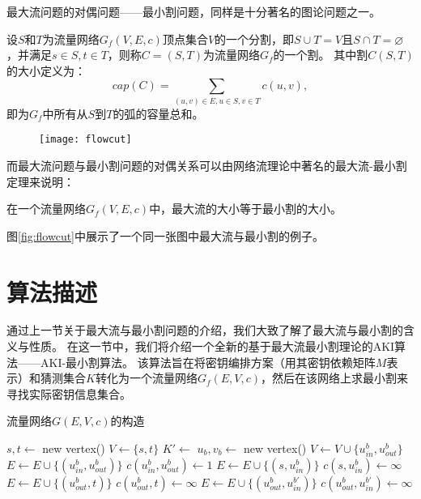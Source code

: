 最大流问题的对偶问题——最小割问题，同样是十分著名的图论问题之一。
\begin{defn}[割]
    设$S$和$T$为流量网络$G_f(V,E,c)$顶点集合$V$的一个分割，即$S\cup T=V$且$S\cap T=\varnothing$，并满足$s\in S,t\in T$，则称$C=(S,T)$为流量网络$G_f$的一个割。
    其中割$C(S,T)$的大小定义为：
    $$cap(C)=\sum_{(u,v)\in E,u\in S,v\in T}c(u,v),$$
    即为$G_f$中所有从$S$到$T$的弧的容量总和。
\end{defn}
\begin{figure}[htbp]
\centering
    \texttt{[image: flowcut]}
\end{figure}
而最大流问题与最小割问题的对偶关系可以由网络流理论中著名的最大流-最小割定理来说明：
\begin{thm}
    在一个流量网络$G_f(V,E,c)$中，最大流的大小等于最小割的大小。
\end{thm}
图\ref{fig:flowcut}中展示了一个同一张图中最大流与最小割的例子。

\section{算法描述}
通过上一节关于最大流与最小割问题的介绍，我们大致了解了最大流与最小割的含义与性质。
在这一节中，我们将介绍一个全新的基于最大流最小割理论的AKI算法——AKI-最小割算法。
该算法旨在将密钥编排方案（用其密钥依赖矩阵$M$表示）和猜测集合$K$转化为一个流量网络$G_f(E,V,c)$，然后在该网络上求最小割来寻找实际密钥信息集合。
\begin{algorithm}[h]
    \caption{流量网络$G(E,V,c)$的构造}
    \begin{algorithmic}[1]
            \State $s,t \gets$ new vertex()
            \State $V \gets \{s,t\}$
            \State $K' \gets$ 
            \State $u_b,v_b \gets$ new vertex()
            \State $V \gets V \cup \{u^b_{in},u^b_{out}\}$
            \State $E \gets E \cup \{(u^b_{in},u^b_{out})\}$
            \State $c(u^b_{in},u^b_{out}) \gets 1$
            \State $E \gets E \cup \{(s,u^b_{in})\}$
            \State $c(s,u^b_{in}) \gets \infty$
            \EndIf
            \State $E \gets E \cup \{(u^b_{out},t)\}$
            \State $c(u^b_{out},t) \gets \infty$ \EndIf
            \EndFor
            \State $E \gets E \cup \{(u^b_{out},u^{b'}_{in})\}$
            \State $c(u^b_{out},u^{b'}_{in}) \gets \infty$
            \EndIf
            \EndFor
            \State {}
        \EndFunction 
    \end{algorithmic}
    \label{alg:const}
\end{algorithm}

